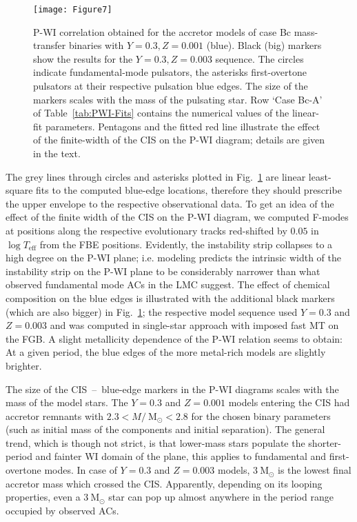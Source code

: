 \documentclass[a4paper,fleqn,usenatbib]{mnras}
\newcommand{\msol}{~\mathrm{M}_\odot}
\newcommand{\teff}{T_{\mathrm{eff}}}
\begin{document}
\begin{figure}
	\texttt{[image: Figure7]}
    \caption{P-WI correlation obtained for the 
    		 accretor models of case Bc mass-transfer binaries 
    		 with $Y=0.3, Z=0.001$ (blue). Black (big) markers show the
    		 results for the $Y=0.3, Z=0.003$ sequence.
    		 The circles indicate fundamental-mode
    		 pulsators, the asterisks first-overtone pulsators at their
    		 respective pulsation blue edges. The size of the markers
    		 scales with the mass of the pulsating star. Row `Case Bc-A' of 
    		 Table~\ref{tab:PWI-Fits} contains
             the numerical values of the linear-fit parameters.
             Pentagons and the fitted red line illustrate the effect of
             the finite-width of the CIS on the P-WI diagram; details are given in the text.}
    \label{fig:PWI_BcA}
\end{figure}

The grey lines through circles and asterisks plotted in Fig.~\ref{fig:PWI_BcA} are linear 
least-square fits to the computed blue-edge locations, therefore they should prescribe the upper
envelope to the respective observational data.  
To get an idea of the effect of the finite width of the CIS on the P-WI diagram, 
we computed F-modes at positions along the respective evolutionary tracks 
red-shifted by $0.05$ in $\log \teff$ from the FBE positions.
Evidently, the instability strip collapses to a high degree on the P-WI plane; 
i.e. modeling predicts the intrinsic width of the instability strip on the P-WI plane 
to be considerably narrower than what observed fundamental mode ACs in the LMC suggest.
The effect of chemical composition on the blue edges is illustrated with the additional 
black markers (which are also bigger) in  Fig.~\ref{fig:PWI_BcA}; the respective model sequence 
used  $Y=0.3$ and $Z=0.003$ and was computed in single-star approach with imposed 
fast MT on the FGB. 
A slight metallicity dependence of the P-WI relation seems to obtain: 
At a given period, the blue edges of the more metal-rich models are slightly brighter.

The size of the CIS~--~blue-edge markers in the P-WI diagrams 
scales with the mass of the model stars. 
The $Y=0.3$ and $Z=0.001$ models entering the CIS had accretor remnants with 
$2.3 < M/\msol < 2.8$  for the chosen binary parameters 
(such as initial mass of the components and initial separation). 
The general trend, which is though not strict, is that lower-mass stars populate
the shorter-period and fainter WI domain of the plane, this applies to fundamental 
and first-overtone modes. 
In case of  $Y=0.3$ and $Z=0.003$ models, $3 \msol$ is the lowest final accretor mass 
which crossed the CIS. Apparently, depending on its looping properties, even a $3 \msol$ star 
can pop up almost anywhere in the period range occupied by observed ACs. 
\end{document}
